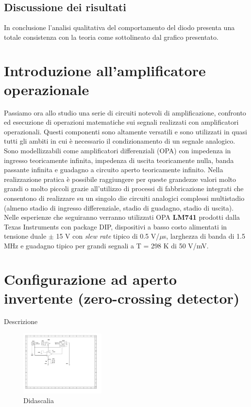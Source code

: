 \documentclass[journal]{IEEEtran}
\begin{document}
\subsection{\textbf{Discussione dei risultati}}
In conclusione l'analisi qualitativa del comportamento del diodo presenta una totale consistenza con la teoria come sottolineato dal grafico presentato.


\section{\textbf{Introduzione all'amplificatore operazionale}}
Passiamo ora allo studio una serie di circuiti notevoli di amplificazione, confronto ed esecuzione di operazioni matematiche sui segnali realizzati con amplificatori operazionali. Questi componenti sono altamente versatili e sono utilizzati in quasi tutti gli ambiti in cui è necessario il condizionamento di un segnale analogico. Sono modellizzabili come amplificatori differenziali (OPA) con impedenza in ingresso teoricamente infinita, impedenza di uscita teoricamente nulla, banda passante infinita e guadagno a circuito aperto teoricamente infinito. Nella realizzazione pratica è possibile raggiungere per queste grandezze valori molto grandi o molto piccoli grazie all'utilizzo di processi di fabbricazione integrati che consentono di realizzare su un singolo die circuiti analogici complessi multistadio (almeno stadio di ingresso differenziale, stadio di guadagno, stadio di uscita). Nelle esperienze che seguiranno verranno utilizzati OPA \textbf{LM741} prodotti dalla Texas Instruments con package DIP, dispositivi a basso costo alimentati in tensione duale $\pm$ 15 V con \textit{slew rate} tipico di 0.5 V/$\mu$s, larghezza di banda di 1.5 MHz e guadagno tipico per grandi segnali a T = 298 K di 50 V/mV. \cite{H}

\section{\textbf{Configurazione ad aperto invertente (zero-crossing detector)}} %
Descrizione

\begin{figure}[H]%
\begin {center}
\includegraphics[width=0.38\textwidth]{sch-simulations/output/OPA-open-loop-inverting.pdf}
\caption{Didascalia}
\label{fig:oscilloscope}
\end {center}
\end{figure}
\end{document}
